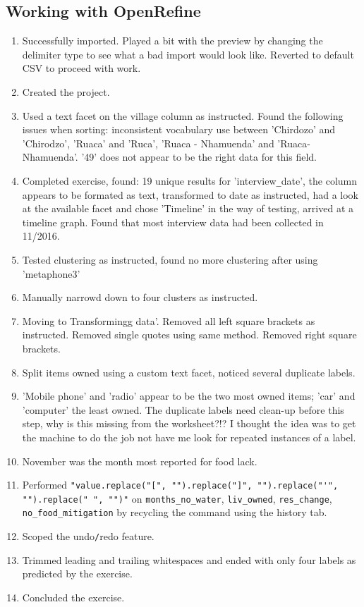 \documentclass{article}
\begin{document}
\subsection{Working with OpenRefine}
\begin{enumerate}
    \item Successfully imported. Played a bit with the preview by changing the delimiter type to see what a bad import would look like. Reverted to default CSV to proceed with work.
    \item Created the project.
    \item Used a text facet on the village column as instructed. Found the following issues when sorting: inconsistent vocabulary use between 'Chirdozo' and 'Chirodzo', 'Ruaca' and 'Ruca', 'Ruaca - Nhamuenda' and 'Ruaca-Nhamuenda'. '49' does not appear to be the right data for this field.
    \item Completed exercise, found: 19 unique results for 'interview\verb|_|date', the column appears to be formated as text, transformed to date as instructed, had a look at the available facet and chose 'Timeline' in the way of testing, arrived at a timeline graph. Found that most interview data had been collected in 11/2016.
    \item Tested clustering as instructed, found no more clustering after using 'metaphone3'
    \item Manually narrowd down to four clusters as instructed.
    \item Moving to Transformingg data'. Removed all left square brackets as instructed. Removed single quotes using same method. Removed right square brackets.
    \item Split items owned using a custom text facet, noticed several duplicate labels.
    \item 'Mobile phone' and 'radio' appear to be the two most owned items; 'car' and 'computer' the least owned. The duplicate labels need clean-up before this step, why is this missing from the worksheet?!? I thought the idea was to get the machine to do the job not have me look for repeated instances of a label.
    \item November was the month most reported for food lack.
    \item Performed \newline \verb|"value.replace("[", "").replace("]", "").replace("'", "").replace(" ", "")"| on \verb|months_no_water|, \verb|liv_owned|, \verb|res_change|, \verb|no_food_mitigation| by recycling the command using the history tab.
    \item Scoped the undo\verb|/|redo feature.
    \item Trimmed leading and trailing whitespaces and ended with only four labels as predicted by the exercise.
    \item Concluded the exercise.
\end{enumerate}
\end{document}

